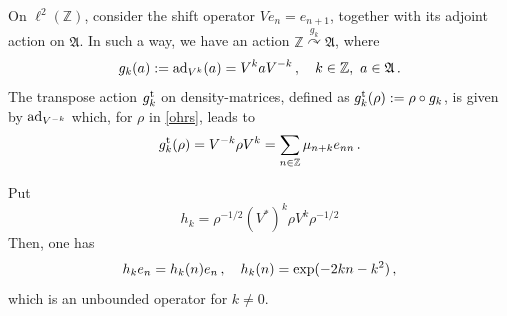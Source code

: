 \documentclass[12pt]{amsart}
\numberwithin{equation}{section}
\def\ga{{\mathfrak A}} \def\gpa{{\mathfrak a}}
\def\bz{{\mathbb Z}}
\def\r{\rho}\def\R{\mathop{\rm P}}
\begin{document}
On $\ell^2(\mathbb Z)$, consider the shift operator $Ve_n=e_{n+1}$, together with its adjoint action on $\ga$. In such a way, we have an action $\bz\stackrel{g_k}{\curvearrowright}\ga$, where
\begin{equation}
\label{ohrs1}
g_k(a):={\rm ad}_{V^k}(a)=V^{k}aV^{-k}\,,\quad k\in\mathbb Z,\,\,a\in\ga\,. 
\end{equation}
The transpose action $g_k^{\rm t}$ on density-matrices, defined as $g_k^{\rm t}(\r):=\r\circ g_k$, is given by ${\rm ad}_{V^{-k}}$ which, for $\r$ in \eqref{ohrs}, leads to
\begin{equation}
\label{dual}
g_k^{\rm t}(\r)=
V^{-k}\rho V^k=\sum_{n\in\mathbb Z}\mu_{n+k}e_{nn}\,.
\end{equation}

Put
\begin{equation}
\label{hk}
h_k=\rho^{-1/2}(V^*)^k\rho V^k\rho^{-1/2} 
\end{equation}
Then, one has
\begin{equation*}
h_ke_n=h_k(n)e_n\,,\quad h_k(n)={\rm exp}(-2 kn- k^2)\,,
\end{equation*}
which is an unbounded operator for $k\neq 0$. 
\end{document}
